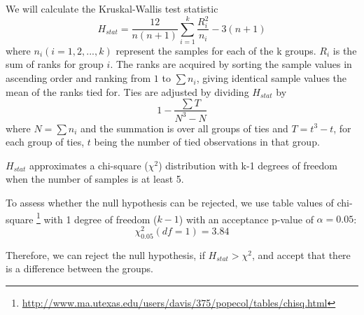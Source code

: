 \documentclass[10pt,letterpaper,two column,final]{article}
\begin{document}
We will calculate the Kruskal-Wallis test statistic
\[
H_{stat} = \frac{12}{n(n+1)}\sum\limits_{i = 1}^{k} \frac{R^{2}_{i}}{n_{i}} - 3(n+1)
\]
where $n_{i} (i = 1, 2, ..., k)$ represent the samples for each of the k
groups. $R_{i}$ is the sum of ranks for group $i$. The ranks are
acquired by sorting the sample values in ascending order and ranking
from $1$ to $\sum n_{i}$, giving identical sample values the mean of the
ranks tied for. Ties are adjusted by dividing $H_{stat}$ by
\[
1 - \frac{\sum T}{N^3-N}
\]
where $N = \sum n_{i}$ and the summation is over all groups of ties and
$T = t^3-t$, for each group of ties, $t$ being the number of tied
observations in that group.

$H_{stat}$ approximates a chi-square ($\chi^2$) distribution with k-1
degrees of freedom when the number of samples is at least 5.

To assess whether the null hypothesis can be rejected, we use table
values of chi-square
\footnote{\url{http://www.ma.utexas.edu/users/davis/375/popecol/tables/chisq.html}}
with 1 degree of freedom ($k-1$) with an acceptance p-value of $\alpha
= 0.05$:
\[
\chi^2_{0.05}(df=1) = 3.84
\]




Therefore, we can reject the null hypothesis, if $H_{stat} > \chi^2$,
and accept that there is a difference between the groups.


\end{document}
